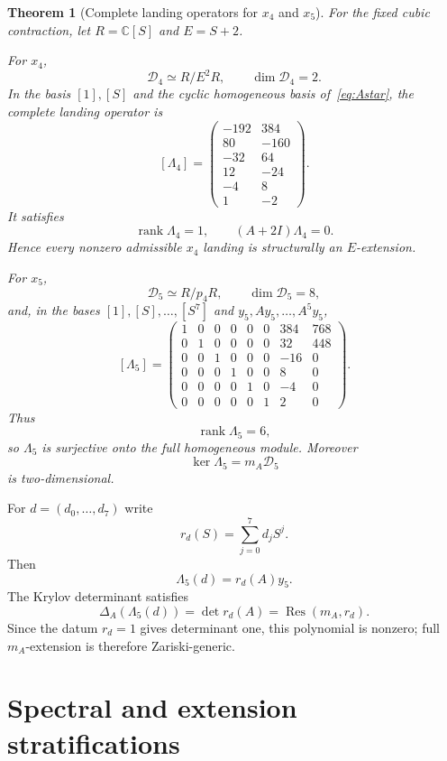\documentclass[11pt]{amsart}
\newtheorem{theorem}{Theorem}[section]
\newcommand{\rank}{\operatorname{rank}}
\newcommand{\C}{\mathbb C}
\begin{document}
\begin{theorem}[Complete landing operators for $x_4$ and $x_5$]\label{thm:complete-landing}
For the fixed cubic contraction, let $R=\C[S]$ and $E=S+2$.

For $x_4$,
\[
\mathscr D_4\simeq R/E^2R,
\qquad
\dim\mathscr D_4=2.
\]
In the basis $[1],[S]$ and the cyclic homogeneous basis of~\eqref{eq:Astar}, the complete landing operator is
\[
[\Lambda_4]=
\begin{pmatrix}
-192&384\\
80&-160\\
-32&64\\
12&-24\\
-4&8\\
1&-2
\end{pmatrix}.
\]
It satisfies
\[
\boxed{\rank\Lambda_4=1,
\qquad
(A+2I)\Lambda_4=0.}
\]
Hence every nonzero admissible $x_4$ landing is structurally an $E$-extension.

For $x_5$,
\[
\mathscr D_5\simeq R/p_4R,
\qquad
\dim\mathscr D_5=8,
\]
and, in the bases $[1],[S],\ldots,[S^7]$ and $y_5,Ay_5,\ldots,A^5y_5$,
\[
[\Lambda_5]=
\begin{pmatrix}
1&0&0&0&0&0&384&768\\
0&1&0&0&0&0&32&448\\
0&0&1&0&0&0&-16&0\\
0&0&0&1&0&0&8&0\\
0&0&0&0&1&0&-4&0\\
0&0&0&0&0&1&2&0
\end{pmatrix}.
\]
Thus
\[
\boxed{\rank\Lambda_5=6,}
\]
so $\Lambda_5$ is surjective onto the full homogeneous module.  Moreover
\[
\ker\Lambda_5=m_A\mathscr D_5
\]
is two-dimensional.
\end{theorem}

For $d=(d_0,\ldots,d_7)$ write
\[
r_d(S)=\sum_{j=0}^7d_jS^j.
\]
Then
\[
\Lambda_5(d)=r_d(A)y_5.
\]
The Krylov determinant satisfies
\begin{equation}\label{eq:landing-resultant}
\boxed{
\Delta_A(\Lambda_5(d))
=\det r_d(A)
=\operatorname{Res}(m_A,r_d).
}
\end{equation}
Since the datum $r_d=1$ gives determinant one, this polynomial is nonzero; full $m_A$-extension is therefore Zariski-generic.

\section{Spectral and extension stratifications}\label{sec:stratification}
\end{document}
